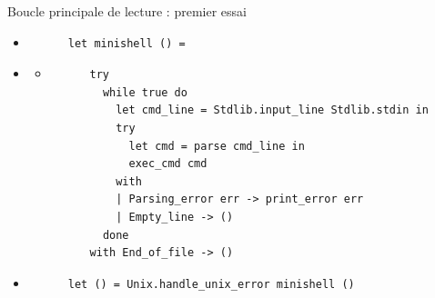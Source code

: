\begin{frame}[fragile]{Boucle principale de lecture : premier essai}
  \begin{itemize}
    \item<1->
    \begin{lstlisting}
      let minishell () =
    \end{lstlisting}
    \item<2-> \begin{itemize} \item \begin{lstlisting}
      try
        while true do
          let cmd_line = Stdlib.input_line Stdlib.stdin in
          try
            let cmd = parse cmd_line in
            exec_cmd cmd
          with
          | Parsing_error err -> print_error err
          | Empty_line -> ()
        done
      with End_of_file -> ()
    \end{lstlisting} \end{itemize}
    \item <1->
    \begin{lstlisting}
      let () = Unix.handle_unix_error minishell ()
    \end{lstlisting}
    \end{itemize}
\end{frame}
